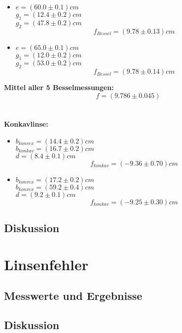 \documentclass[12pt,a4paper]{article}
\begin{document}
\begin{multicols}{2}
\begin{itemize}
	\item $e=(60.0 \pm 0.1)cm$\\
	\indent $g_1= (12.4 \pm 0.2) cm$\\
	$g_2 = (47.8 \pm 0.2)cm$
	$$f_{Bessel}=(9.78 \pm 0.13) cm$$
	
	\item $e=(65.0 \pm 0.1)cm$\\
	\indent $g_1 = (12.0 \pm 0.2) cm$\\
	$g_2 =(53.0 \pm 0.2)cm$
	$$f_{Bessel} = (9.78 \pm 0.14)cm$$

\end{itemize}

\textbf{Mittel aller 5 Besselmessungen:}\\
$$f=(9.786 \pm 0.045)$$\\
\\
\textbf{Konkavlinse:}
\begin{itemize}
	\item $b_{konvex}=(14.4 \pm 0.2) cm$\\
	$b_{konkav}=(16.7 \pm 0.2)cm$\\
	$d=(8.4 \pm 0.1)cm$
	$$f_{konkav}= (-9.36 \pm 0.70)cm$$
	
	\item $b_{konvex}=(17.2 \pm 0.2)cm$\\
	$b_{konvex}=(59.2 \pm 0.4)cm$\\
	$d=(9.2 \pm 0.1)cm$
	$$f_{konkav}= (-9.25 \pm 0.30)cm$$
	
	
	
\end{itemize}




\subsection{Diskussion}

\section{Linsenfehler}

\subsection{Messwerte und Ergebnisse}

\subsection{Diskussion}


\end{multicols}
\end{document}
